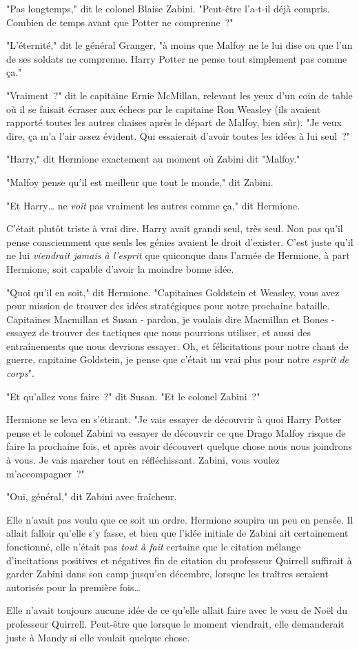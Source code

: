"Pas longtemps," dit le colonel Blaise Zabini. "Peut-être l'a-t-il déjà compris. Combien de temps avant que Potter ne comprenne~?"

"L'éternité," dit le général Granger, "à moins que Malfoy ne le lui dise ou que l'un de ses soldats ne comprenne. Harry Potter ne pense tout simplement pas comme ça."

"Vraiment~?" dit le capitaine Ernie McMillan, relevant les yeux d'un coin de table où il se faisait écraser aux échecs par le capitaine Ron Weasley (ils avaient rapporté toutes les autres chaises après le départ de Malfoy, bien sûr). "Je veux dire, ça m'a l'air assez évident. Qui essaierait d'avoir toutes les idées à lui seul~?"

"Harry," dit Hermione exactement au moment où Zabini dit "Malfoy."

"Malfoy pense qu'il est meilleur que tout le monde," dit Zabini.

"Et Harry… ne \emph{voit} pas vraiment les autres comme ça," dit Hermione.

C'était plutôt triste à vrai dire. Harry avait grandi seul, très seul. Non pas qu'il pense consciemment que seuls les génies avaient le droit d'exister. C'est juste qu'il ne lui \emph{viendrait jamais à l'esprit} que quiconque dans l'armée de Hermione, à part Hermione, soit capable d'avoir la moindre bonne idée.

"Quoi qu'il en soit," dit Hermione. "Capitaines Goldstein et Weasley, vous avez pour mission de trouver des idées stratégiques pour notre prochaine bataille. Capitaines Macmillan et Susan - pardon, je voulais dire Macmillan et Bones - essayez de trouver des tactiques que nous pourrions utiliser, et aussi des entraînements que nous devrions essayer. Oh, et félicitations pour notre chant de guerre, capitaine Goldstein, je pense que c'était un vrai plus pour notre \emph{esprit de corps}".

"Et qu'allez vous faire~?" dit Susan. "Et le colonel Zabini~?"

Hermione se leva en s'étirant. "Je vais essayer de découvrir à quoi Harry Potter pense et le colonel Zabini va essayer de découvrir ce que Drago Malfoy risque de faire la prochaine fois, et après avoir découvert quelque chose nous nous joindrons à vous. Je vais marcher tout en réfléchissant. Zabini, vous voulez m'accompagner~?"

"Oui, général," dit Zabini avec fraîcheur.

Elle n'avait pas voulu que ce soit un ordre. Hermione soupira un peu en pensée. Il allait falloir qu'elle s'y fasse, et bien que l'idée initiale de Zabini ait certainement fonctionné, elle n'était pas \emph{tout à fait} certaine que le citation mélange d'incitations positives et négatives fin de citation du professeur Quirrell suffirait à garder Zabini dans son camp jusqu'en décembre, lorsque les traîtres seraient autorisés pour la première fois…

Elle n'avait toujours aucune idée de ce qu'elle allait faire avec le vœu de Noël du professeur Quirrell. Peut-être que lorsque le moment viendrait, elle demanderait juste à Mandy si elle voulait quelque chose.~ 


